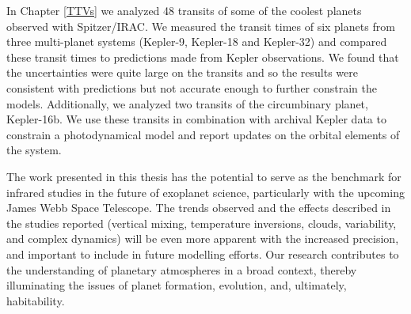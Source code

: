In Chapter \ref{TTVs} we analyzed 48 transits of some of the coolest planets observed with Spitzer/IRAC. We measured the transit times of six planets from three multi-planet systems (Kepler-9, Kepler-18 and Kepler-32) and compared these transit times to predictions made from Kepler observations. We found that the uncertainties were quite large on the \spitzer transits and so the results were consistent with predictions but not accurate enough to further constrain the models. Additionally, we analyzed two transits of the circumbinary planet, Kepler-16b. We use these transits in combination with archival Kepler data to constrain a photodynamical model and report updates on the orbital elements of the system.

The work presented in this thesis has the potential to serve as the benchmark for infrared studies in the future of exoplanet science, particularly with the upcoming James Webb Space Telescope. The trends observed and the effects described in the studies reported (vertical mixing, temperature inversions, clouds, variability, and complex dynamics) will be even more apparent with the increased precision, and important to include in future modelling efforts. Our research contributes to the understanding of planetary atmospheres in a broad context, thereby illuminating the issues of planet formation, evolution, and, ultimately, habitability.

\renewcommand\chapterautorefname{chapter}%


